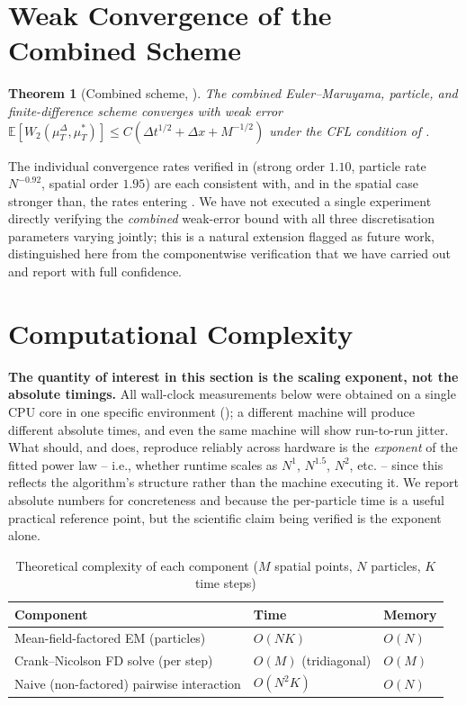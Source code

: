 \documentclass[11pt]{article}
\newtheorem{theorem}{Theorem}[section]
\theoremstyle{remark}
\begin{document}
\section{Weak Convergence of the Combined Scheme}
\label{sec:weak-convergence}

\begin{theorem}[Combined scheme, \citealp{monyimba2026thesis}]
\label{thm:combined-convergence}
The combined Euler--Maruyama, particle, and finite-difference scheme
converges with
weak error $\mathbb{E}[W_2(\mu_T^\Delta,\mu_T^*)] \le C(\Delta t^{1/2}+\Delta
x+M^{-1/2})$ under the CFL condition of .
\end{theorem}

The individual convergence rates verified in  (strong order $1.10$, particle rate
$N^{-0.92}$, spatial order $1.95$) are each consistent with, and in the spatial
case stronger than, the rates entering . We have
not executed a single experiment directly verifying the \emph{combined} weak-error
bound with all three discretisation parameters varying jointly; this is a natural
extension flagged as future work, distinguished here from the componentwise
verification that we have carried out and report with full confidence.

\section{Computational Complexity}
\label{sec:complexity}

\textbf{The quantity of interest in this section is the scaling exponent, not
the absolute timings.} All wall-clock measurements below were obtained on a
single CPU core in one specific environment (); a
different machine will produce different absolute times, and even the same
machine will show run-to-run jitter. What should, and does, reproduce reliably
across hardware is the \emph{exponent} of the fitted power law -- i.e., whether
runtime scales as $N^1$, $N^{1.5}$, $N^2$, etc. -- since this reflects the
algorithm's structure rather than the machine executing it. We report absolute
numbers for concreteness and because the per-particle time is a useful practical
reference point, but the scientific claim being verified is the exponent alone.

\begin{table}[ht]
\centering
\caption{Theoretical complexity of each component ($M$ spatial points, $N$
particles, $K$ time steps)}
\label{tab:complexity}
\begin{tabular}{lll}
\toprule
\textbf{Component} & \textbf{Time} & \textbf{Memory} \\
\midrule
Mean-field-factored EM (particles) & $O(NK)$ & $O(N)$ \\
Crank--Nicolson FD solve (per step) & $O(M)$ (tridiagonal) & $O(M)$ \\
Naive (non-factored) pairwise interaction & $O(N^2K)$ & $O(N)$ \\
\bottomrule
\end{tabular}
\end{table}
\end{document}
